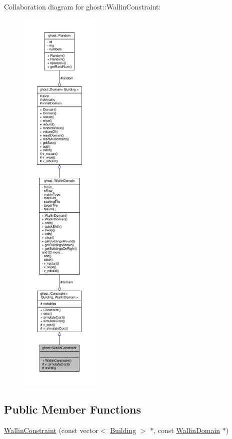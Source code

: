 Collaboration diagram for ghost\-:\-:Wallin\-Constraint\-:\nopagebreak
\begin{figure}[H]
\begin{center}
\leavevmode
\includegraphics[height=550pt]{classghost_1_1WallinConstraint__coll__graph}
\end{center}
\end{figure}
\subsection*{Public Member Functions}
\begin{DoxyCompactItemize}
\item 
\hyperlink{classghost_1_1WallinConstraint_a943d4dcca2afb3cd72cb1049a7f197ff}{Wallin\-Constraint} (const vector$<$ \hyperlink{classghost_1_1Building}{Building} $>$ $\ast$, const \hyperlink{classghost_1_1WallinDomain}{Wallin\-Domain} $\ast$)
\end{DoxyCompactItemize}
